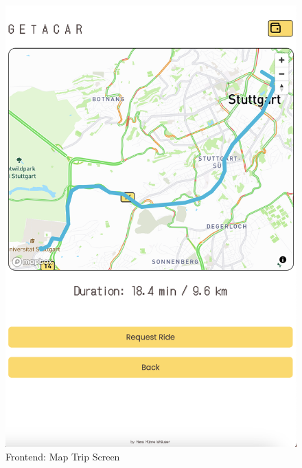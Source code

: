 \begin{figure}[h]
    \centering
    
    \begin{minipage}{0.45\linewidth}
        \centering
        \includegraphics[width=\linewidth]{data/ffss/3.png}
        \caption{Frontend: Map Trip Screen}
        \label{fig:MapTripScreen}
    \end{minipage}
    \hfill
    \begin{minipage}{0.45\linewidth}
        \centering

\end{minipage}
\end{figure}
